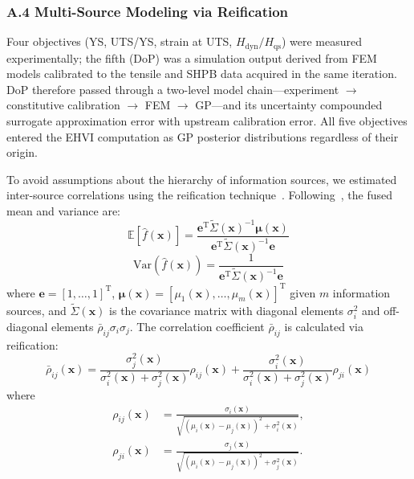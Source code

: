 \subsubsection*{A.4 Multi-Source Modeling via Reification}

Four objectives (YS, UTS/YS, strain at UTS, $H_\text{dyn}/H_\text{qs}$) were measured experimentally; the fifth (DoP) was a simulation output derived from FEM models calibrated to the tensile and SHPB data acquired in the same iteration. DoP therefore passed through a two-level model chain---experiment $\rightarrow$ constitutive calibration $\rightarrow$ FEM $\rightarrow$ GP---and its uncertainty compounded surrogate approximation error with upstream calibration error. All five objectives entered the EHVI computation as GP posterior distributions regardless of their origin.

To avoid assumptions about the hierarchy of information sources, we estimated inter-source correlations using the reification technique~\cite{allaire2012fusing,thomison2017model}. Following~\cite{Winkler_1981}, the fused mean and variance are:
\begin{equation}
\label{e:WinklerMeanGen_app}
\mathbb{E} [\hat{f}(\mathbf{x})]=\frac{\mathbf{e}^\textrm{T} \tilde{\Sigma}(\mathbf{x})^{-1}  \boldsymbol{\mu}(\mathbf{x})}{\mathbf{e}^\textrm{T} \tilde{\Sigma}(\mathbf{x})^{-1} \mathbf{e}}
\end{equation}
\begin{equation}
\label{e:WinklerVarianceGen_app}
\textrm{Var}\left(\hat{f}(\mathbf{x})\right) = \frac{1}{\mathbf{e}^\textrm{T} \tilde{\Sigma}(\mathbf{x})^{-1} \mathbf{e}}
\end{equation}
where $\mathbf{e} = [1,\ldots,1]^\textrm{T}$, $\boldsymbol{\mu}(\mathbf{x}) = [\mu_1(\mathbf{x}),\ldots,\mu_m(\mathbf{x})]^\textrm{T}$ given $m$ information sources, and $\tilde{\Sigma}(\mathbf{x})$ is the covariance matrix with diagonal elements $\sigma_i^2$ and off-diagonal elements $\bar{\rho}_{ij} \sigma_i \sigma_j$. The correlation coefficient $\bar{\rho}_{ij}$ is calculated via reification:
\begin{equation}
\bar{\rho}_{ij}(\mathbf{x}) = \frac{\sigma_j^2(\mathbf{x})}{\sigma_i^2(\mathbf{x}) + \sigma_j^2(\mathbf{x})} \rho_{ij}(\mathbf{x}) + \frac{\sigma_i^2(\mathbf{x})}{\sigma_i^2(\mathbf{x})+\sigma_j^2(\mathbf{x})} \rho_{ji}(\mathbf{x})
\label{e:VWrho_app}
\end{equation}
where
\begin{equation}
\begin{aligned}
\rho_{ij}(\mathbf{x}) &= \frac{\sigma_i(\mathbf{x})}{\sqrt{\left(\mu_i(\mathbf{x})-\mu_j(\mathbf{x})\right)^2 + \sigma_i^2(\mathbf{x})}}, \\
\rho_{ji}(\mathbf{x}) &= \frac{\sigma_j(\mathbf{x})}{\sqrt{\left(\mu_i(\mathbf{x})-\mu_j(\mathbf{x})\right)^2 + \sigma_j^2(\mathbf{x})}}.
\end{aligned}
\label{e:rho_app}
\end{equation}

